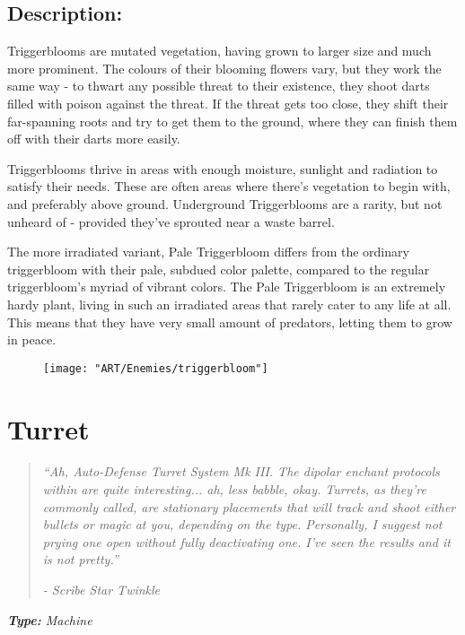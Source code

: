 \documentclass[11pt,a4paper,twocolumn]{book}
\begin{document}
	\subsection*{Description:}
	Triggerblooms are mutated vegetation, having grown to larger size and much more prominent. The colours of their blooming flowers vary, but they work the same way - to thwart any possible threat to their existence, they shoot darts filled with poison against the threat. If the threat gets too close, they shift their far-spanning roots and try to get them to the ground, where they can finish them off with their darts more easily. 
	
	Triggerblooms thrive in areas with enough moisture, sunlight and radiation to satisfy their needs. These are often areas where there's vegetation to begin with, and preferably above ground. Underground Triggerblooms are a rarity, but not unheard of - provided they've sprouted near a waste barrel.
	
	The more irradiated variant, Pale Triggerbloom differs from the ordinary triggerbloom with their pale, subdued color palette, compared to the regular triggerbloom's myriad of vibrant colors. The Pale Triggerbloom is an extremely hardy plant, living in such an irradiated areas that rarely cater to any life at all. This means that they have very small amount of predators, letting them to grow in peace.
	
	\begin{figure}
		\centering
		\texttt{[image: "ART/Enemies/triggerbloom"]}
	\end{figure}
	
	\clearpage
	
	\section*{Turret}
	\begin{quote}
		\emph{``Ah, Auto-Defense Turret System Mk III. The dipolar enchant protocols within are quite interesting... ah, less babble, okay. Turrets, as they're commonly called, are stationary placements that will track and shoot either bullets or magic at you, depending on the type. Personally, I suggest not prying one open without fully deactivating one. I've seen the results and it is not pretty.''}
		
		\emph{-	Scribe Star Twinkle}
	\end{quote}
	
	\emph{\textbf{Type:} Machine}
	
\end{document}
